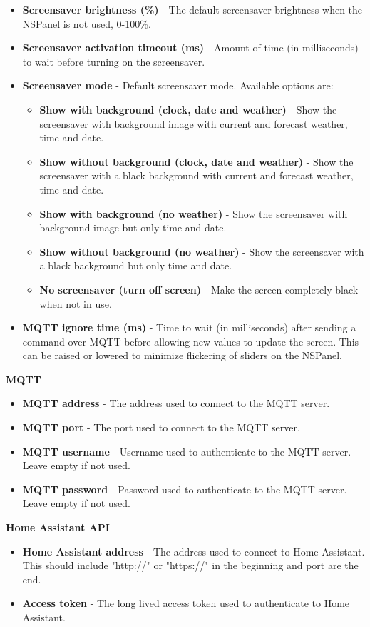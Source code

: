 \documentclass[10pt]{article}
\begin{document}
\begin{itemize}
      \item \textbf{Screensaver brightness (\%)} - The default screensaver brightness when the NSPanel is not used, 0-100\%.
      \item \textbf{Screensaver activation timeout (ms)} - Amount of time (in milliseconds) to wait before turning on the screensaver.
      \item \textbf{Screensaver mode} - Default screensaver mode. Available options are:
      \begin{itemize}
        \item \textbf{Show with background (clock, date and weather)} - Show the screensaver with background image with current and forecast weather, time and date.
        \item \textbf{Show without background (clock, date and weather)} - Show the screensaver with a black background with current and forecast weather, time and date.
        \item \textbf{Show with background (no weather)} - Show the screensaver with background image but only time and date.
        \item \textbf{Show without background (no weather)} - Show the screensaver with a black background but only time and date.
        \item \textbf{No screensaver (turn off screen)} - Make the screen completely black when not in use.
      \end{itemize}
      \item \textbf{MQTT ignore time (ms)} - Time to wait (in milliseconds) after sending a command over MQTT before allowing new values to update the screen. This can be raised or lowered to minimize flickering of sliders on the NSPanel.
    \end{itemize}

    \textbf{MQTT}
    \begin{itemize}
      \item \textbf{MQTT address} - The address used to connect to the MQTT server.
      \item \textbf{MQTT port} - The port used to connect to the MQTT server.
      \item \textbf{MQTT username} - Username used to authenticate to the MQTT server. Leave empty if not used.
      \item \textbf{MQTT password} - Password used to authenticate to the MQTT server. Leave empty if not used.
    \end{itemize}

    \textbf{Home Assistant API}
    \begin{itemize}
      \item \textbf{Home Assistant address} - The address used to connect to Home Assistant. This should include "http://" or "https://" in the beginning and port are the end.
      \item \textbf{Access token} - The long lived access token used to authenticate to Home Assistant.
    \end{itemize}
\end{document}
